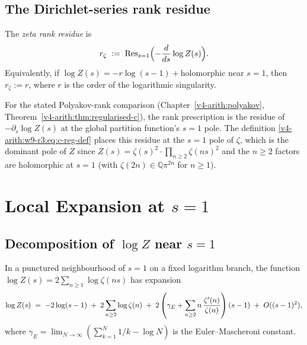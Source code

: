 \subsection{The Dirichlet-series rank residue}
\label{v4-arith:w9-r3:dirichlet-reg}

\begin{definition}
\label{v4-arith:w9-r3:def:c-reg}
The \emph{zeta rank residue} is
\begin{equation}
\label{v4-arith:w9-r3:eq:c-reg-def}
r_{\zeta}\;:=\;\mathrm{Res}_{s=1}\Bigl(-\frac{d}{ds}\log Z(s)\Bigr).
\end{equation}
Equivalently, if \(\log Z(s)=-r\log(s-1)+\mathrm{holomorphic}\) near \(s=1\),
then \(r_{\zeta}:=r\), where \(r\) is the order of the logarithmic
singularity.
\end{definition}

\begin{remark}
\label{v4-arith:w9-r3:rem:residue-rationale}
For the stated Polyakov-rank comparison (Chapter~\ref{v4-arith:polyakov},
Theorem~\ref{v4-arith:thm:regularised-c}), the
rank prescription is the residue of
\(-\partial_s\log Z(s)\) at the global partition function's
\(s=1\) pole. The definition
\eqref{v4-arith:w9-r3:eq:c-reg-def} places this residue at the
\(s=1\) pole of \(\zeta\), which is the dominant pole of \(Z\) since
\(Z(s)=\zeta(s)^{2}\cdot\prod_{n\geq 2}\zeta(ns)^{2}\) and the \(n\geq 2\)
factors are holomorphic at \(s=1\) (with \(\zeta(2n)\in\mathbb{Q}\pi^{2n}\)
for \(n\geq 1\)).
\end{remark}

\section{Local Expansion at \(s=1\)}
\label{v4-arith:w9-r3:continuation}

\subsection{Decomposition of \(\log Z\) near \(s=1\)}
\label{v4-arith:w9-r3:log-Z-decomp}

\begin{theorem}[local Laurent expansion of \(\log Z\) at \(s=1\)]
\label{v4-arith:w9-r3:thm:log-Z-laurent}
In a punctured neighbourhood of \(s=1\) on a
fixed logarithm branch, the function
\(\log Z(s)=2\sum_{n\geq 1}\log\zeta(ns)\) has expansion
\begin{equation}
\label{v4-arith:w9-r3:eq:log-Z-laurent}
\log Z(s)\;=\;-2\log(s-1)\;+\;2\sum_{n\geq 2}\log\zeta(n)
\;+\;2\left(\gamma_{E}+\sum_{n\geq2}n\,{\zeta'(n)\over\zeta(n)}\right)(s-1)
\;+\;O((s-1)^{2}),
\end{equation}
where \(\gamma_{E}=\lim_{N\to\infty}(\sum_{k=1}^{N}1/k-\log N)\) is
the Euler--Mascheroni constant.
\end{theorem}

